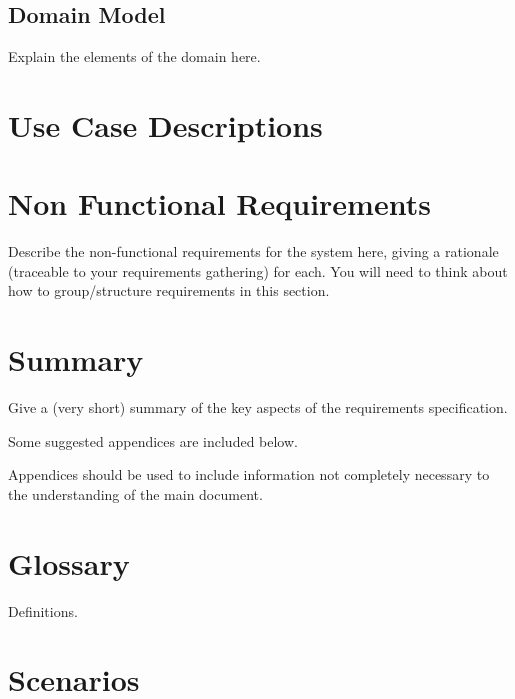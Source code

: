 \documentclass{l3deliverable}
\begin{document}

\subsection{Domain Model}

Explain the elements of the domain here.


\section{Use Case Descriptions}



\section{Non Functional Requirements}

Describe the non-functional requirements for the system here, giving a
rationale (traceable to your requirements gathering) for each.  You
will need to think about how to group/structure requirements in this
section.


\section{Summary}

Give a (very short) summary of the key aspects of the requirements
specification.


\appendix

Some suggested appendices are included below.

Appendices should be used to include information not completely
necessary to the understanding of the main document.

\section{Glossary}

Definitions.

\section{Scenarios}
\end{document}
